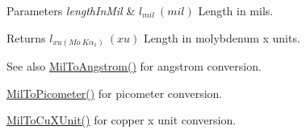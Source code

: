 \begin{DoxyParams}{Parameters}
{\em length\+In\+Mil} & $ l_{mil}\ (mil)$ Length in mils. \\
\hline
\end{DoxyParams}
\begin{DoxyReturn}{Returns}
$ l_{xu(Mo\ K\alpha_1)}\ (xu)$ Length in molybdenum x units. 
\end{DoxyReturn}
\begin{DoxySeeAlso}{See also}
\mbox{\hyperlink{group___e_g_x_math-_conversions-_length_conversions-_imperial-_mil-_non-_s_i_gad209d1b047ce810b8879b9ea1ff4a5a5}{Mil\+To\+Angstrom()}} for angstrom conversion. 

\mbox{\hyperlink{group___e_g_x_math-_conversions-_length_conversions-_imperial-_mil-_s_i_ga29a85f8ec2e5cf4d963468f882de8447}{Mil\+To\+Picometer()}} for picometer conversion. 

\mbox{\hyperlink{group___e_g_x_math-_conversions-_length_conversions-_imperial-_mil-_non-_s_i_ga92f713e3dddc0a45caa3fc6b5e8ca442}{Mil\+To\+Cu\+X\+Unit()}} for copper x unit conversion. 
\end{DoxySeeAlso}
